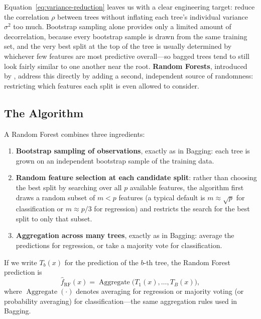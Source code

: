 \documentclass[12pt,a4paper]{article}
\begin{document}
Equation~\eqref{eq:variance-reduction} leaves us with a clear engineering target: reduce the correlation $\rho$ between trees without inflating each tree's individual variance $\sigma^2$ too much. Bootstrap sampling alone provides only a limited amount of decorrelation, because every bootstrap sample is drawn from the same training set, and the very best split at the top of the tree is usually determined by whichever few features are most predictive overall---so bagged trees tend to still look fairly similar to one another near the root. \textbf{Random Forests}, introduced by \citet{breiman2001randomforests}, address this directly by adding a second, independent source of randomness: restricting which features each split is even allowed to consider.

\subsection{The Algorithm}

A Random Forest combines three ingredients:

\begin{enumerate}
    \item \textbf{Bootstrap sampling of observations}, exactly as in Bagging: each tree is grown on an independent bootstrap sample of the training data.
    \item \textbf{Random feature selection at each candidate split}: rather than choosing the best split by searching over all $p$ available features, the algorithm first draws a random subset of $m < p$ features (a typical default is $m \approx \sqrt{p}$ for classification or $m \approx p/3$ for regression) and restricts the search for the best split to only that subset.
    \item \textbf{Aggregation across many trees}, exactly as in Bagging: average the predictions for regression, or take a majority vote for classification.
\end{enumerate}

If we write $T_b(x)$ for the prediction of the $b$-th tree, the Random Forest prediction is
\begin{equation}
\label{eq:rf-prediction}
\hat f_{\text{RF}}(x) = \operatorname{Aggregate}\big(T_1(x), \ldots, T_B(x)\big),
\end{equation}
where $\operatorname{Aggregate}(\cdot)$ denotes averaging for regression or majority voting (or probability averaging) for classification---the same aggregation rules used in Bagging.
\end{document}
